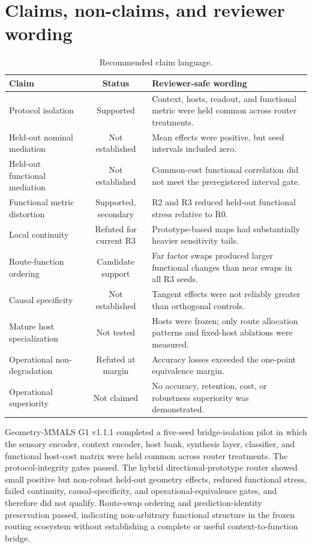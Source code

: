 \documentclass[11pt,a4paper]{article}
\begin{document}
\section{Claims, non-claims, and reviewer wording}
\begin{table}[H]
\centering
\caption{Recommended claim language.}
\label{tab:claims}
\small
\begin{tabularx}{\textwidth}{@{}Y c Y@{}}
\toprule
Claim & Status & Reviewer-safe wording \\
\midrule
Protocol isolation & Supported & Context, hosts, readout, and functional metric were held common across router treatments. \\
Held-out nominal mediation & Not established & Mean effects were positive, but seed intervals included zero. \\
Held-out functional mediation & Not established & Common-cost functional correlation did not meet the preregistered interval gate. \\
Functional metric distortion & Supported, secondary & R2 and R3 reduced held-out functional stress relative to R0. \\
Local continuity & Refuted for current R3 & Prototype-based maps had substantially heavier sensitivity tails. \\
Route-function ordering & Candidate support & Far factor swaps produced larger functional changes than near swaps in all R3 seeds. \\
Causal specificity & Not established & Tangent effects were not reliably greater than orthogonal controls. \\
Mature host specialization & Not tested & Hosts were frozen; only route allocation patterns and fixed-host ablations were measured. \\
Operational non-degradation & Refuted at margin & Accuracy losses exceeded the one-point equivalence margin. \\
Operational superiority & Not claimed & No accuracy, retention, cost, or robustness superiority was demonstrated. \\
\bottomrule
\end{tabularx}
\end{table}

\begin{plainbox}
Geometry-MMALS G1 v1.1.1 completed a five-seed bridge-isolation pilot in which the sensory encoder, context encoder, host bank, synthesis layer, classifier, and functional host-cost matrix were held common across router treatments. The protocol-integrity gates passed. The hybrid directional-prototype router showed small positive but non-robust held-out geometry effects, reduced functional stress, failed continuity, causal-specificity, and operational-equivalence gates, and therefore did not qualify. Route-swap ordering and prediction-identity preservation passed, indicating non-arbitrary functional structure in the frozen routing ecosystem without establishing a complete or useful context-to-function bridge.
\end{plainbox}
\end{document}
